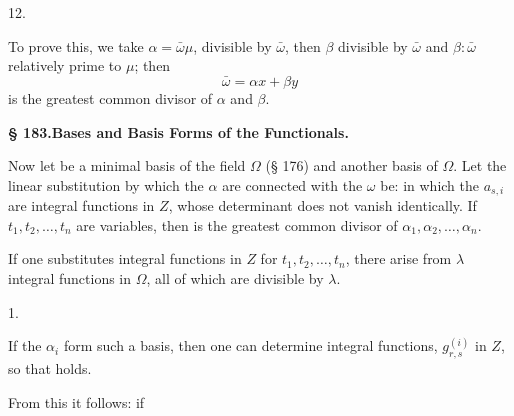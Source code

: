 12. 

To prove this, we take $\alpha = \bar\omega \mu$, divisible by $\bar\omega$,
then $\beta$ divisible by $\bar\omega$ and $\beta : \bar\omega$ relatively prime to $\mu$; then
\[
\bar\omega = \alpha x + \beta y
\]
is the greatest common divisor of $\alpha$ and $\beta$.

\begin{center}
\textbf{§ 183.\qquad Bases and Basis Forms of the Functionals.}
\end{center}

Now let
be a minimal basis of the field $\Omega$ (§ 176) and
another basis of $\Omega$. Let the linear substitution by which
the $\alpha$ are connected with the $\omega$ be:
in which the $a_{s,i}$ are integral functions in $Z$, whose determinant
does not vanish identically. If $t_1, t_2, \ldots, t_n$ are variables, then
is the greatest common divisor of $\alpha_1, \alpha_2, \ldots, \alpha_n$.

If one substitutes integral functions in $Z$ for $t_1, t_2, \ldots, t_n$, there arise
 from $\lambda$ integral functions in $\Omega$, all of which are divisible by $\lambda$.

1. 

If the $\alpha_i$ form such a basis, then one can determine integral functions,
$g_{r,s}^{(i)}$ in $Z$, so that
holds.

From this it follows:
if
